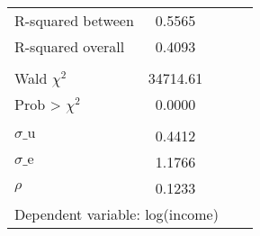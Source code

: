 {\begin{tabular}{l*{1}{cccc}}
R-squared between   &      0.5565&            &            &            \\
R-squared overall   &      0.4093&            &            &            \\
\\ Wald $\chi^2$    &    34714.61&            &            &            \\
Prob > $\chi^2$     &      0.0000&            &            &            \\
\\ $\sigma\text{\_u}$&      0.4412&            &            &            \\
$\sigma\text{\_e}$   &      1.1766&            &            &            \\
$\rho$              &      0.1233&            &            &            \\
\bottomrule
\multicolumn{5}{l}{\footnotesize Dependent variable: log(income)}\\
\end{tabular}
}
